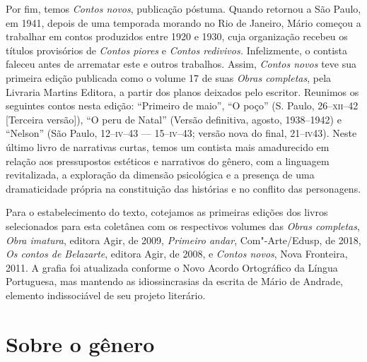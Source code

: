 Por fim, temos \emph{Contos novos}, publicação póstuma. Quando retornou
a São Paulo, em 1941, depois de uma temporada morando no Rio de Janeiro,
Mário começou a trabalhar em contos produzidos entre 1920 e 1930, cuja
organização recebeu os títulos provisórios de \emph{Contos piores} e
\emph{Contos redivivos.} Infelizmente, o contista faleceu antes de
arrematar este e outros trabalhos. Assim, \emph{Contos novos} teve sua
primeira edição publicada como o volume 17 de suas \emph{Obras
completas}, pela Livraria Martins Editora, a partir dos planos deixados
pelo escritor. Reunimos os seguintes contos nesta edição: ``Primeiro de
maio'', ``O poço'' (S. Paulo, 26--\textsc{xii}--42 {[}Terceira versão{]}), ``O peru
de Natal'' (Versão definitiva, agosto, 1938--1942) e ``Nelson'' (São
Paulo, 12--\textsc{iv}--43 --- 15--\textsc{iv}--43; versão nova do final, 21--\textsc{iv}43). %
Neste
último livro de narrativas curtas, temos um contista mais amadurecido em
relação aos pressupostos estéticos e narrativos do gênero, com a
linguagem revitalizada, a exploração da dimensão psicológica e a
presença de uma dramaticidade própria na constituição das histórias e no
conflito das personagens.

Para o estabelecimento do texto, cotejamos as primeiras edições dos
livros selecionados para esta coletânea com os respectivos volumes das
\emph{Obras completas}, \emph{Obra imatura}, editora Agir, de 2009,
\emph{Primeiro andar}, Com"-Arte/Edusp, de 2018, \emph{Os contos de
Belazarte}, editora Agir, de 2008, e \emph{Contos novos}, Nova
Fronteira, 2011. A grafia foi atualizada conforme o Novo Acordo
Ortográfico da Língua Portuguesa, mas mantendo as idiossincrasias da
escrita de Mário de Andrade, elemento indissociável de seu projeto
literário.

\section{Sobre o gênero}